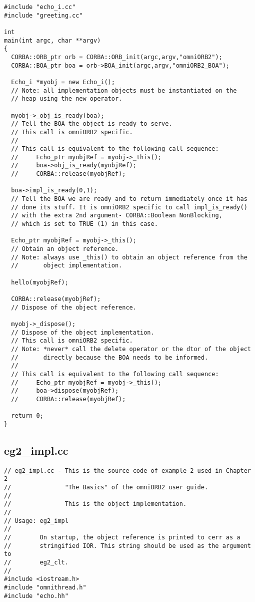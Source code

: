 \documentclass[11pt,twoside,onecolumn]{book}
\begin{document}
{\begin{verbatim}
#include "echo_i.cc"
#include "greeting.cc"

int
main(int argc, char **argv)
{
  CORBA::ORB_ptr orb = CORBA::ORB_init(argc,argv,"omniORB2");
  CORBA::BOA_ptr boa = orb->BOA_init(argc,argv,"omniORB2_BOA");

  Echo_i *myobj = new Echo_i();
  // Note: all implementation objects must be instantiated on the
  // heap using the new operator.

  myobj->_obj_is_ready(boa);
  // Tell the BOA the object is ready to serve.
  // This call is omniORB2 specific.
  //
  // This call is equivalent to the following call sequence:
  //     Echo_ptr myobjRef = myobj->_this();
  //     boa->obj_is_ready(myobjRef);
  //     CORBA::release(myobjRef);

  boa->impl_is_ready(0,1);
  // Tell the BOA we are ready and to return immediately once it has
  // done its stuff. It is omniORB2 specific to call impl_is_ready()
  // with the extra 2nd argument- CORBA::Boolean NonBlocking,
  // which is set to TRUE (1) in this case.

  Echo_ptr myobjRef = myobj->_this();
  // Obtain an object reference.
  // Note: always use _this() to obtain an object reference from the
  //       object implementation.

  hello(myobjRef);

  CORBA::release(myobjRef);
  // Dispose of the object reference.

  myobj->_dispose();
  // Dispose of the object implementation.
  // This call is omniORB2 specific.
  // Note: *never* call the delete operator or the dtor of the object
  //       directly because the BOA needs to be informed.
  //
  // This call is equivalent to the following call sequence:
  //     Echo_ptr myobjRef = myobj->_this();
  //     boa->dispose(myobjRef);
  //     CORBA::release(myobjRef);

  return 0;
}
\end{verbatim}
\newpage

\subsection{eg2\_impl.cc}
\begin{verbatim}
// eg2_impl.cc - This is the source code of example 2 used in Chapter 2
//               "The Basics" of the omniORB2 user guide.
//
//               This is the object implementation.
//
// Usage: eg2_impl
//
//        On startup, the object reference is printed to cerr as a
//        stringified IOR. This string should be used as the argument to 
//        eg2_clt.
//
#include <iostream.h>
#include "omnithread.h"
#include "echo.hh"


\end{verbatim}}
\end{document}

